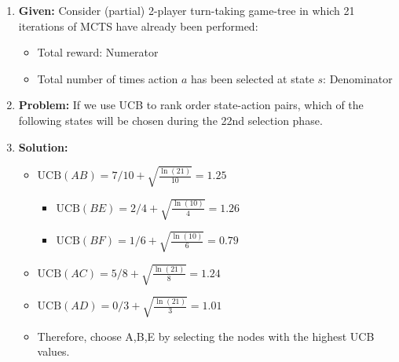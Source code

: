 \begin{example}
    \begin{enumerate}
        \item \textbf{Given:} Consider (partial) 2-player turn-taking game-tree in which 21 iterations of MCTS have already been performed: 
        \begin{itemize}
            \item Total reward: Numerator
            \item Total number of times action $a$ has been selected at state $s$: Denominator
        \end{itemize}
        \item \textbf{Problem:} If we use UCB to rank order state-action pairs, which of the following states will be chosen during the 22nd selection phase. 
        \item \textbf{Solution:}
        \begin{itemize}
            \item $\text{UCB}(AB) = 7/10 + \sqrt{\frac{\ln(21)}{10}} = 1.25$
            \begin{itemize}
                \item $\text{UCB}(BE) = 2/4 + \sqrt{\frac{\ln(10)}{4}} = 1.26$
                \item $\text{UCB}(BF) = 1/6 + \sqrt{\frac{\ln(10)}{6}} = 0.79$
            \end{itemize}
            \item $\text{UCB}(AC) = 5/8 + \sqrt{\frac{\ln(21)}{8}} = 1.24$
            \item $\text{UCB}(AD) = 0/3 + \sqrt{\frac{\ln(21)}{3}} = 1.01$
            \item Therefore, choose A,B,E by selecting the nodes with the highest UCB values.
        \end{itemize}
    \end{enumerate}
\end{example}
\newpage

